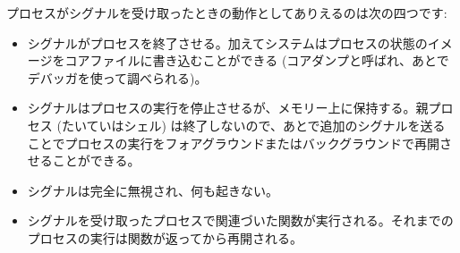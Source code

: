 プロセスがシグナルを受け取ったときの動作としてありえるのは次の四つです:
%
\begin{itemize}
\item
  シグナルがプロセスを終了させる。加えてシステムはプロセスの状態のイメージをコアファイルに書き込むことができる (コアダンプと呼ばれ、あとでデバッガを使って調べられる)。
%
\item
  シグナルはプロセスの実行を停止させるが、メモリー上に保持する。親プロセス (たいていはシェル) は終了しないので、あとで追加のシグナルを送ることでプロセスの実行をフォアグラウンドまたはバックグラウンドで再開させることができる。
%
\item %
  シグナルは完全に無視され、何も起きない。
%
\item
  シグナルを受け取ったプロセスで関連づいた関数が実行される。それまでのプロセスの実行は関数が返ってから再開される。
\end{itemize}
%

